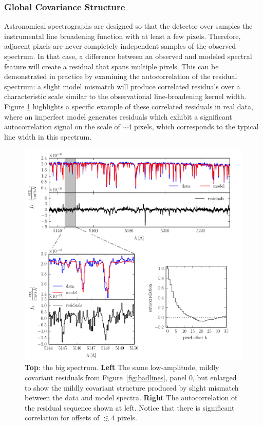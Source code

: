 \documentclass[iop,floatfix]{emulateapj}
\begin{document}
\subsubsection{Global Covariance Structure}
\label{subsec:global_covariance}

Astronomical spectrographs are designed so that the detector over-samples the instrumental line 
broadening function with at least a few pixels.  Therefore, adjacent pixels are never completely 
independent samples of the observed spectrum.  In that case, a difference between an observed and 
modeled spectral feature will create a residual that spans multiple pixels.  This can be 
demonstrated in practice by examining the autocorrelation of the residual spectrum: a slight model 
mismatch will produce correlated residuals over a characteristic scale similar to the observational 
line-broadening kernel width.  Figure \ref{fig:class0} highlights a specific example of these 
correlated residuals in real data, where an imperfect model generates residuals which exhibit a 
significant autocorrelation signal on the scale of $\sim$4 pixels, which corresponds to the typical 
line width in this spectrum.  

\begin{figure}[!htb]
\begin{center}
  \includegraphics{correlation_panel.pdf}
  \caption{\textbf{Top}: the big spectrum. \textbf{Left} The same low-amplitude, mildly covariant residuals from Figure~\ref{fig:badlines}, panel 0, but enlarged to show the mildly covariant structure produced by slight mismatch between the data and model spectra.   
  \textbf{Right} The autocorrelation of the residual sequence shown at left. Notice that there is significant correlation for offsets of $\lesssim 4$ pixels.}
\label{fig:class0}
\end{center}
\end{figure}
\end{document}
